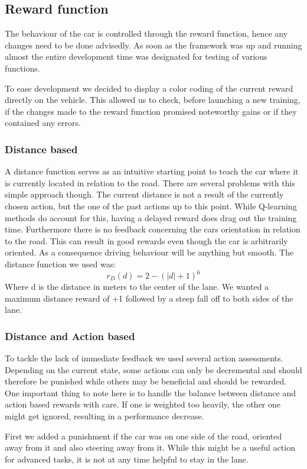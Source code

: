 \subsection{Reward function}
The behaviour of the car is controlled through the reward function, hence any changes need to be done advisedly. As soon as the framework was up and running almost the entire development time was designated for testing of various functions. 

To ease development we decided to display a color coding of the current reward directly on the vehicle. This allowed us to check, before launching a new training, if the changes made to the reward function promised noteworthy gains or if they contained any errors. 
\subsubsection{Distance based}
A distance function serves as an intuitive starting point to teach the car where it is currently located in relation to the road. There are several problems with this simple approach though. The current distance is not a result of the currently chosen action, but the one of the past actions up to this point. While Q-learning methods do account for this, having a delayed reward does drag out the training time. Furthermore there is no feedback concerning the cars orientation in relation to the road. This can result in good rewards even though the car is arbitrarily oriented. As a consequence driving behaviour will be anything but smooth. The distance function we used was:
\[ r_D(d) = 2 - (|d| + 1)^6 \]
Where d is the distance in meters to the center of the lane. We wanted a maximum distance reward of +1 followed by a steep fall off to both sides of the lane.
\subsubsection{Distance and Action based}
To tackle the lack of immediate feedback we used several action assessments. Depending on the current state, some actions can only be decremental and should therefore be punished while others may be beneficial and should be rewarded. One important thing to note here is to handle the balance between distance and action based rewards with care. If one is weighted too heavily, the other one might get ignored, resulting in a performance decrease.

First we added a punishment if the car was on one side of the road, oriented away from it and also steering away from it. While this might be a useful action for advanced tasks, it is not at any time helpful to stay in the lane.


